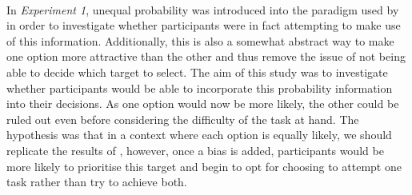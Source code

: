 \documentclass[12pt]{article}
\begin{document}
\paragraph{} In \textit{Experiment 1}, unequal probability was introduced into the paradigm used by \cite{clarke2015failure} in order to investigate whether participants were in fact attempting to make use of this information. Additionally, this is also a somewhat abstract way to make one option more attractive than the other and thus remove the issue of not being able to decide which target to select. The aim of this study was to investigate whether participants would be able to incorporate this probability information into their decisions. As one option would now be more likely, the other could be ruled out even before considering the difficulty of the task at hand. The hypothesis was that in a context where each option is equally likely, we should replicate the results of \cite{clarke2015failure}, however, once a bias is added, participants would be more likely to prioritise this target and begin to opt for choosing to attempt one task rather than try to achieve both.  %



\end{document}
